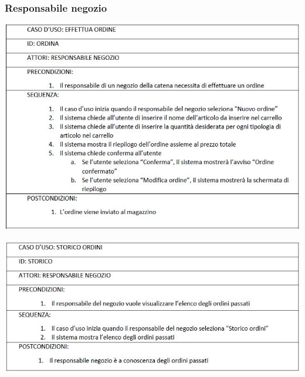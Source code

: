 \documentclass[a4paper]{article}
\begin{document}
	\subsubsection{Responsabile negozio}
	\begin{center}
		\includegraphics [scale=0.5] {new_order}\\
	\end{center}
		\begin{center}
		\includegraphics [scale=0.5] {orders_list}\\
	\end{center}
\end{document}
